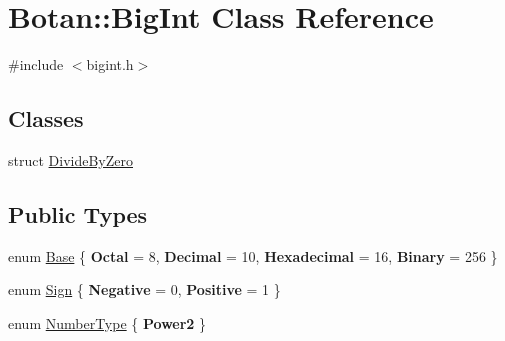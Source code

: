 \hypertarget{classBotan_1_1BigInt}{\section{Botan\-:\-:Big\-Int Class Reference}
\label{classBotan_1_1BigInt}
}


{\ttfamily \#include $<$bigint.\-h$>$}

\subsection*{Classes}
\begin{DoxyCompactItemize}
\item 
struct \hyperlink{structBotan_1_1BigInt_1_1DivideByZero}{Divide\-By\-Zero}
\end{DoxyCompactItemize}
\subsection*{Public Types}
\begin{DoxyCompactItemize}
\item 
enum \hyperlink{classBotan_1_1BigInt_a2f432a3a957f2e25c78af361ab662a23}{Base} \{ {\bfseries Octal} = 8, 
{\bfseries Decimal} = 10, 
{\bfseries Hexadecimal} = 16, 
{\bfseries Binary} = 256
 \}
\item 
enum \hyperlink{classBotan_1_1BigInt_ad4cc39c2c247db669ac07e5501dbf84d}{Sign} \{ {\bfseries Negative} = 0, 
{\bfseries Positive} = 1
 \}
\item 
enum \hyperlink{classBotan_1_1BigInt_a04e15539ce23aadc724b1be759873341}{Number\-Type} \{ {\bfseries Power2}
 \}
\end{DoxyCompactItemize}
